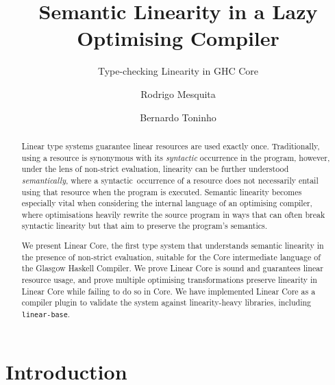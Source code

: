 \documentclass[acmsmall,review,anonymous,screen]{acmart}
\title{Semantic Linearity in a Lazy Optimising Compiler}
\subtitle{Type-checking Linearity in GHC Core}
\author{Rodrigo Mesquita}
\affiliation{
   \institution{Well-Typed LLP}
 }
\author{Bernardo Toninho}
\affiliation{
  \department{Departamento de Inform\'{a}tica}
  \institution{NOVA-LINCS, FCT-NOVA, Universidade Nova de Lisboa}
  \country{Portugal}}
\begin{document}
\begin{abstract}
Linear type systems guarantee linear resources are used exactly once.
Traditionally, using a resource is synonymous with its \emph{syntactic}
occurrence in the program, however, under the lens of non-strict evaluation,
linearity can be further understood \emph{semantically}, where a
syntactic occurrence of a resource does not necessarily entail
using that resource when the program is executed.
Semantic linearity becomes especially vital when considering the
internal language of an optimising compiler, where optimisations
heavily rewrite the source program in ways that can often break
syntactic linearity but that aim to preserve the program's semantics.
%

We present Linear Core, the first type system that understands semantic
linearity in the presence of non-strict evaluation, suitable for the Core
intermediate language of the Glasgow Haskell Compiler. We prove Linear Core
is sound and guarantees linear resource usage, and prove multiple optimising
transformations preserve linearity in Linear Core while failing to do so in
Core. We have implemented Linear Core as a compiler plugin to validate the
system against linearity-heavy libraries, including
\texttt{linear-base}.%
\end{abstract}

\maketitle

\section{Introduction}\label{sec:intro}

\end{document}
